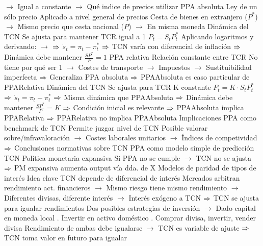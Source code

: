 \documentclass{nuevotema}
\begin{document}
\begin{esquemal}
				\4[] $\to$ Igual a constante
				\4[] $\to$ Qué indice de precios utilizar
			\3 PPA absoluta
				\4 Ley de un sólo precio
				\4[] Aplicado a nivel general de precios
				\4[] Cesta de bienes en extranjero ($P^*$)
				\4[] $\to$ Mismo precio que cesta nacional ($P$)
				\4[] $\to$ En misma moneda
				\4[] 
				\4 Dinámica del TCN
				\4[] Se ajusta para mantener TCR igual a 1
				\4[] $P_t = S_t P^*_t$
				\4[] Aplicando logaritmos y derivando:
				\4[] $\to$ 
				\4[] $\Rightarrow$ $\dot{s}_t = \pi_t - \pi_t^*$
				\4[] $\Rightarrow$ TCN varía con diferencial de inflación
				\4[] $\Rightarrow$ Dinámica debe mantener $\frac{SP^*}{P} = 1$
			\3 PPA relativa
				\4 Relación constante entre TCR
				\4[] No tiene por qué ser 1
				\4[] $\to$ Costes de transporte
				\4[] $\to$ Impuestos
				\4[] $\to$ Sustituibilidad imperfecta
				\4[] $\Rightarrow$ Generaliza PPA absoluta
				\4[] $\Rightarrow$ PPAAbsoluta es caso particular de PPARelativa
				\4[] 
				\4 Dinámica del TCN
				\4[] Se ajusta para TCR K constante
				\4[] $P_t = K \cdot S_t P^*_t$
				\4[] $\Rightarrow$ $\dot{s}_t = \pi_t - \pi_t^*$
				\4[] $\Rightarrow$ Misma dinámica que PPAAbsoluta
				\4[] $\Rightarrow$ Dinámica debe mantener $\frac{SP^*}{P} = K$
				\4[] $\Rightarrow$ Condición inicial es relevante
				\4[] $\Rightarrow$ PPAAbsoluta implica PPARelativa
				\4[] $\Rightarrow$ PPARelativa no implica PPAAbsoluta
			\3 Implicaciones
				\4 PPA como benchmark de TCN
				\4[] Permite juzgar nivel de TCN
				\4[] Posible valorar sobre/infravaloración
				\4[] $\to$ Costes laborales unitarios
				\4[] $\to$ Índices de competividad
				\4[] $\Rightarrow$ Conclusiones normativas sobre TCN
				\4 PPA como modelo simple de predicción TCN
				\4 Política monetaria expansiva
				\4[] Si PPA no se cumple
				\4[] $\to$ TCN no se ajusta
				\4[] $\Rightarrow$ PM expansiva aumenta output vía dda. de X
		\2 Modelos de paridad de tipos de interés
			\3 Idea clave
				\4 TCN depende de diferencial de interés
				\4[] Mercados arbitran rendimiento act. financieros
				\4[] $\to$ Mismo riesgo tiene mismo rendimiento
				\4[] $\to$ Diferentes divisas, diferente interés
				\4[] $\to$ Interés exógeno a TCN
				\4[] $\Rightarrow$ TCN se ajusta para igualar rendimientos
				\4 Dos posibles estrategias de inversión
				\4[] $\to$ Dado capital en moneda local
				. Invertir en activo doméstico
				. Comprar divisa, invertir, vender divisa
				\4[] Rendimiento de ambas debe igualarse
				\4[] $\to$ TCN es variable de ajuste
				\4[] $\Rightarrow$ TCN toma valor en futuro para igualar

\end{esquemal}
\end{document}
